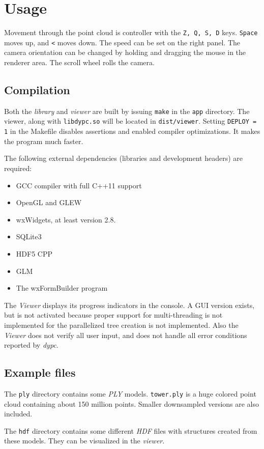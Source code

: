 \documentclass[a4paper,10pt,abstracton,notitlepage]{scrreprt}
\begin{document}
\section{Usage}
Movement through the point cloud is controller with the \texttt{Z, Q, S, D} keys. \texttt{Space} moves up, and \texttt{<} moves down. The speed can be set on the right panel. The camera orientation can be changed by holding and dragging the mouse in the renderer area. The scroll wheel rolls the camera.

\subsection{Compilation}
Both the \emph{library} and \emph{viewer} are built by issuing \texttt{make} in the \texttt{app} directory. The viewer, along with \texttt{libdypc.so} will be located in \texttt{dist/viewer}. Setting \texttt{DEPLOY = 1} in the Makefile disables assertions and enabled compiler optimizations. It makes the program much faster.

The following external dependencies (libraries and development headers) are required:
\begin{itemize}
\item GCC compiler with full C++11 support
\item OpenGL and GLEW
\item wxWidgets, at least version 2.8.
\item SQLite3
\item HDF5 CPP
\item GLM
\item The wxFormBuilder program
\end{itemize}

The \emph{Viewer} displays its progress indicators in the console. A GUI version exists, but is not activated because proper support for multi-threading is not implemented for the parallelized tree creation is not implemented. Also the \emph{Viewer} does not verify all user input, and does not handle all error conditions reported by \emph{dypc}.


\subsection{Example files}
The \texttt{ply} directory contains some \emph{PLY} models. \texttt{tower.ply} is a huge colored point cloud containing about 150 million points. Smaller downsampled versions are also included.

The \texttt{hdf} directory contains some different \emph{HDF} files with structures created from these models. They can be visualized in the \emph{viewer}.
\end{document}
